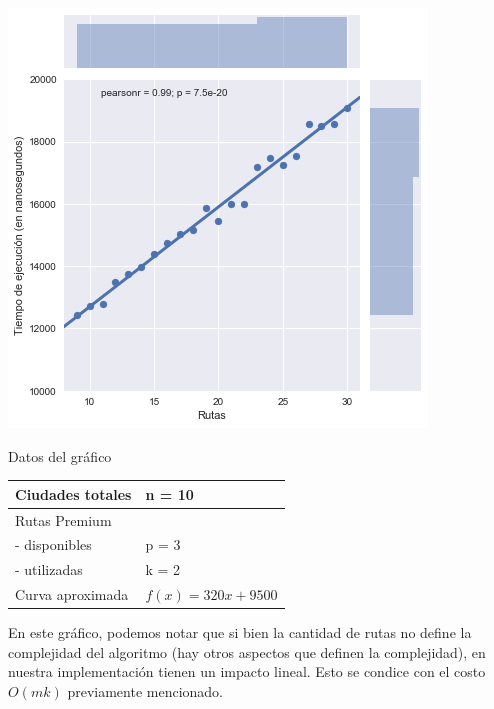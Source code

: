 \noindent
\begin{minipage}{0.55\textwidth}
	\hfill
	\includegraphics[scale=0.65]{imagenes/ej1-2.png}
\end{minipage}
\hfill
\begin{minipage}{0.42\textwidth}
	\begin{center}
		Datos del gráfico

		\begin{tabular}{ | l l |}
			\hline
			Ciudades totales & n = 10 \\ \hline
			Rutas Premium & \\
			- disponibles & p = 3 \\
			- utilizadas & k = 2 \\ \hline
			Curva aproximada & $f(x) = 320 x + 9500$ \\
			\hline
		\end{tabular}
	\end{center}
\end{minipage}

En este gráfico, podemos notar que si bien la cantidad de rutas no define la complejidad del algoritmo (hay otros aspectos que definen la complejidad), en nuestra implementación tienen un impacto lineal. Esto se condice con el costo $O(mk)$ previamente mencionado.

